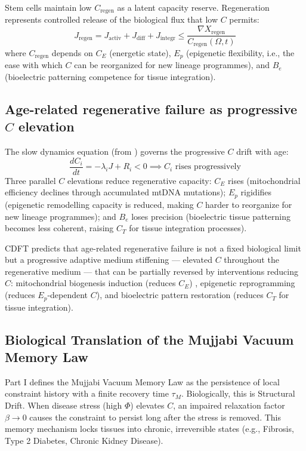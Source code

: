 \documentclass[12pt,a4paper]{article}
\newcommand{\Om}{\Omega}
\begin{document}
Stem cells maintain low $C_{\mathrm{regen}}$ as a latent capacity reserve. Regeneration represents controlled release of the biological flux that low $C$ permits:
\begin{equation}
J_{\mathrm{regen}} = J_{\mathrm{activ}} + J_{\mathrm{diff}} + J_{\mathrm{integr}} \leq \frac{\nabla X_{\mathrm{regen}}}{C_{\mathrm{regen}}(\Om, t)}
\end{equation}
where $C_{\mathrm{regen}}$ depends on $C_E$ (energetic state), $E_p$ (epigenetic flexibility, i.e., the ease with which $C$ can be reorganized for new lineage programmes), and $B_e$ (bioelectric patterning competence for tissue integration).

\subsection{Age-related regenerative failure as progressive $C$ elevation}

The slow dynamics equation (from \citep{MujjabiPartI2026}) governs the progressive $C$ drift with age:
\begin{equation}
\frac{dC_i}{dt} = -\lambda_i J + R_i < 0 \implies C_i \text{ rises progressively}
\end{equation}
Three parallel $C$ elevations reduce regenerative capacity: $C_E$ rises (mitochondrial efficiency declines through accumulated mtDNA mutations); $E_p$ rigidifies (epigenetic remodelling capacity is reduced, making $C$ harder to reorganize for new lineage programmes); and $B_e$ loses precision (bioelectric tissue patterning becomes less coherent, raising $C_T$ for tissue integration processes).

CDFT predicts that age-related regenerative failure is not a fixed biological limit but a progressive adaptive medium stiffening --- elevated $C$ throughout the regenerative medium --- that can be partially reversed by interventions reducing $C$: mitochondrial biogenesis induction (reduces $C_E$) \citep{holloszy1967}, epigenetic reprogramming (reduces $E_p$-dependent $C$), and bioelectric pattern restoration (reduces $C_T$ for tissue integration).



\subsection{Biological Translation of the Mujjabi Vacuum Memory Law \cite{MujjabiPartI2026}}
Part I defines the Mujjabi Vacuum Memory Law \cite{MujjabiPartI2026} as the persistence of local constraint history with a finite recovery time $\tau_M$. Biologically, this is Structural Drift. When disease stress (high $\Phi$) elevates $C$, an impaired relaxation factor $\beta \to 0$ causes the constraint to persist long after the stress is removed. This memory mechanism locks tissues into chronic, irreversible states (e.g., Fibrosis, Type 2 Diabetes, Chronic Kidney Disease).
\end{document}

